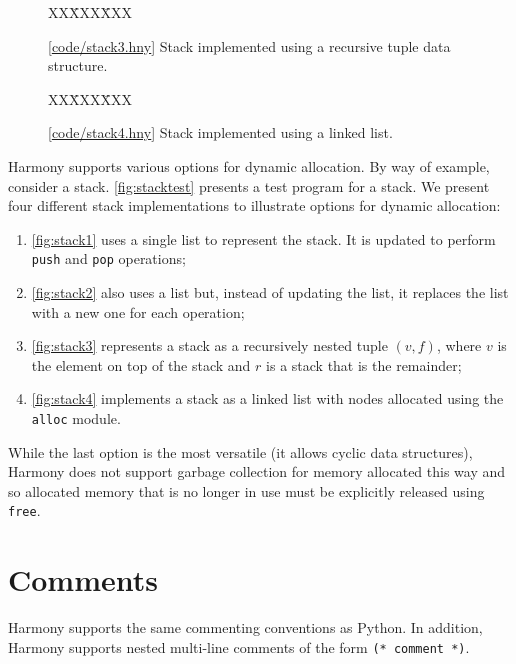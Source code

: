 \documentclass{report}
\newcommand{\harmonysource}[1]{
\begin{tabbing}
XX\=XXX\=XXX\kill
    
\end{tabbing}
}
\newcommand{\harmonylink}[1]{%
[\href{https://harmony.cs.cornell.edu/#1}{\underline{#1}}]%
}
\newenvironment{code}{
\tcolorbox
}{
\endtcolorbox
}
\begin{document}
\begin{figure}
\begin{code}
\harmonysource{stack3}
\end{code}
\caption{\harmonylink{code/stack3.hny} Stack implemented using a recursive tuple data structure.}
\label{fig:stack3}
\end{figure}

\begin{figure}
\begin{code}
\harmonysource{stack4}
\end{code}
\caption{\harmonylink{code/stack4.hny} Stack implemented using a linked list.}
\label{fig:stack4}
\end{figure}

Harmony supports various options for dynamic allocation.
By way of example, consider a stack.
\autoref{fig:stacktest} presents a test program for a stack.
We present four different stack implementations to illustrate
options for dynamic allocation:
\begin{enumerate}
\item[] \autoref{fig:stack1} uses a single list to represent the
stack.  It is updated to perform \texttt{push} and \texttt{pop} operations;
\item[] \autoref{fig:stack2} also uses a list but, instead of updating
the list, it replaces the list with a new one for each operation;
\item[] \autoref{fig:stack3} represents a stack as a recursively nested tuple
$(v, f)$, where $v$ is the element on top of the stack and $r$ is a stack
that is the remainder;
\item[] \autoref{fig:stack4} implements a stack as a linked list with nodes
allocated using the \texttt{alloc} module.
\end{enumerate}

While the last option is the most versatile (it allows cyclic
data structures), Harmony does not support garbage collection
for memory allocated this way and so allocated memory that is no
longer in use must be explicitly released using \texttt{free}.

\section{Comments}

Harmony supports the same commenting conventions as Python.
In addition, Harmony supports nested multi-line comments
of the form \texttt{(* comment *)}.
\end{document}
